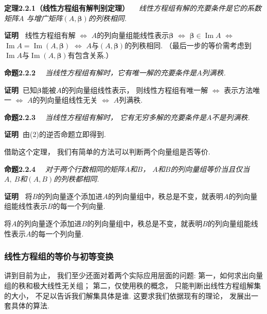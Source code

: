 \medskip

\textbf{定理2.2.1（线性方程组有解判别定理）}
\textit{~~线性方程组有解的充要条件是它的系数矩阵$A$
与增广矩阵$(A,\bm{\beta})$的列秩相同.}

\textbf{证明\ }
线性方程组有解
$\Longleftrightarrow$
$A$的列向量组能线性表示$\bm{\beta}$
$\Longleftrightarrow$
$\bm{\beta} \in \operatorname{Im}A$
$\Longleftrightarrow$
$\operatorname{Im}A=\operatorname{Im}(A , \bm{\beta})$
$\Longleftrightarrow$
$A$与$(A , \bm{\beta})$的列秩相同.
（最后一步的等价需考虑到$\operatorname{Im}A$与$\operatorname{Im}(A,\bm{\beta})$有包含关系.）
\medskip

\textbf{命题2.2.2}
\textit{~~当线性方程组有解时，它有唯一解的充要条件是$A$列满秩.}

\textbf{证明\ }已知$\bm{\beta}$能被$A$的列向量组线性表示，
则线性方程组有唯一解
$\Longleftrightarrow$
表示方法唯一
$\Longleftrightarrow$
$A$的列向量组线性无关
$\Longleftrightarrow$
$A$列满秩.\medskip

\textbf{命题2.2.3}
\textit{~~当线性方程组有解时，
它有无穷多解的充要条件是$A$不是列满秩.}

\textbf{证明\ }由(2)的逆否命题立即得到.\medskip

借助这个定理，
我们有简单的方法可以判断两个向量组是否等价.\medskip

\textbf{命题2.2.4}
\textit{~~对于两个行数相同的矩阵$A$和$B$，
$A$和$B$的列向量组等价当且仅当$A,~B$和$(A,B)$的列秩都相同.}

\textbf{证明\ }
将$B$的列向量逐个添加进$A$的列向量组中，秩总是不变，就表明$A$的列向量组能线性表示$B$的每一个列向量.

将$A$的列向量逐个添加进$B$的列向量组中，秩总是不变，就表明$B$的列向量组能线性表示$A$的每一个列向量.

\subsubsection{线性方程组的等价与初等变换}

讲到目前为止，
我们至少还面对着两个实际应用层面的问题:
第一，如何求出向量组的秩和极大线性无关组；
第二，仅使用秩的概念，
只能判断出线性方程组解集的大小，
不足以告诉我们解集具体是谁.
这要求我们依据现有的理论，
发展出一套具体的算法.

